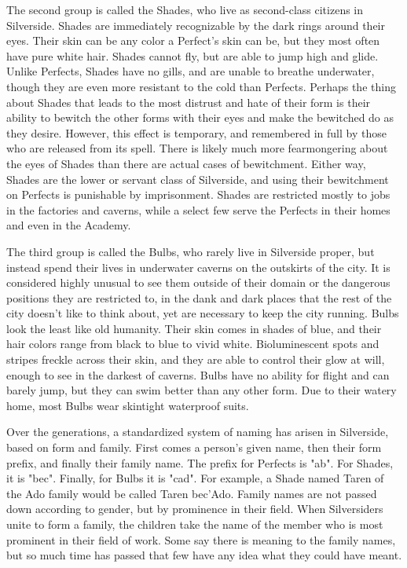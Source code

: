 \documentclass[blue]{Silversiders}
\begin{document}
The second group is called the Shades, who live as second-class citizens in Silverside. Shades are immediately recognizable by the dark rings around their eyes. Their skin can be any color a Perfect's skin can be, but they most often have pure white hair. Shades cannot fly, but are able to jump high and glide. Unlike Perfects, Shades have no gills, and are unable to breathe underwater, though they are even more resistant to the cold than Perfects. Perhaps the thing about Shades that leads to the most distrust and hate of their form is their ability to bewitch the other forms with their eyes and make the bewitched do as they desire. However, this effect is temporary, and remembered in full by those who are released from its spell. There is likely much more fearmongering about the eyes of Shades than there are actual cases of bewitchment. Either way, Shades are the lower or servant class of Silverside, and using their bewitchment on Perfects is punishable by imprisonment. Shades are restricted mostly to jobs in the factories and caverns, while a select few serve the Perfects in their homes and even in the Academy.

The third group is called the Bulbs, who rarely live in Silverside proper, but instead spend their lives in underwater caverns on the outskirts of the city. It is considered highly unusual to see them outside of their domain or the dangerous positions they are restricted to, in the dank and dark places that the rest of the city doesn't like to think about, yet are necessary to keep the city running. Bulbs look the least like old humanity. Their skin comes in shades of blue, and their hair colors range from black to blue to vivid white. Bioluminescent spots and stripes freckle across their skin, and they are able to control their glow at will, enough to see in the darkest of caverns. Bulbs have no ability for flight and can barely jump, but they can swim better than any other form. Due to their watery home, most Bulbs wear skintight waterproof suits.

Over the generations, a standardized system of naming has arisen in Silverside, based on form and family. First comes a person's given name, then their form prefix, and finally their family name. The prefix for Perfects is "ab". For Shades, it is "bec". Finally, for Bulbs it is "cad". For example, a Shade named Taren of the Ado family would be called Taren bec'Ado. Family names are not passed down according to gender, but by prominence in their field. When Silversiders unite to form a family, the children take the name of the member who is most prominent in their field of work. Some say there is meaning to the family names, but so much time has passed that few have any idea what they could have meant.
\end{document}
